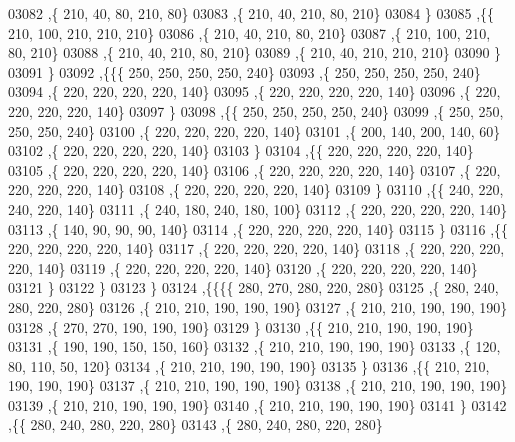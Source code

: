 \begin{DoxyCode}
03082     ,\{   210,    40,    80,   210,    80\}
03083     ,\{   210,    40,   210,    80,   210\}
03084     \}
03085    ,\{\{   210,   100,   210,   210,   210\}
03086     ,\{   210,    40,   210,    80,   210\}
03087     ,\{   210,   100,   210,    80,   210\}
03088     ,\{   210,    40,   210,    80,   210\}
03089     ,\{   210,    40,   210,   210,   210\}
03090     \}
03091    \}
03092   ,\{\{\{   250,   250,   250,   250,   240\}
03093     ,\{   250,   250,   250,   250,   240\}
03094     ,\{   220,   220,   220,   220,   140\}
03095     ,\{   220,   220,   220,   220,   140\}
03096     ,\{   220,   220,   220,   220,   140\}
03097     \}
03098    ,\{\{   250,   250,   250,   250,   240\}
03099     ,\{   250,   250,   250,   250,   240\}
03100     ,\{   220,   220,   220,   220,   140\}
03101     ,\{   200,   140,   200,   140,    60\}
03102     ,\{   220,   220,   220,   220,   140\}
03103     \}
03104    ,\{\{   220,   220,   220,   220,   140\}
03105     ,\{   220,   220,   220,   220,   140\}
03106     ,\{   220,   220,   220,   220,   140\}
03107     ,\{   220,   220,   220,   220,   140\}
03108     ,\{   220,   220,   220,   220,   140\}
03109     \}
03110    ,\{\{   240,   220,   240,   220,   140\}
03111     ,\{   240,   180,   240,   180,   100\}
03112     ,\{   220,   220,   220,   220,   140\}
03113     ,\{   140,    90,    90,    90,   140\}
03114     ,\{   220,   220,   220,   220,   140\}
03115     \}
03116    ,\{\{   220,   220,   220,   220,   140\}
03117     ,\{   220,   220,   220,   220,   140\}
03118     ,\{   220,   220,   220,   220,   140\}
03119     ,\{   220,   220,   220,   220,   140\}
03120     ,\{   220,   220,   220,   220,   140\}
03121     \}
03122    \}
03123   \}
03124  ,\{\{\{\{   280,   270,   280,   220,   280\}
03125     ,\{   280,   240,   280,   220,   280\}
03126     ,\{   210,   210,   190,   190,   190\}
03127     ,\{   210,   210,   190,   190,   190\}
03128     ,\{   270,   270,   190,   190,   190\}
03129     \}
03130    ,\{\{   210,   210,   190,   190,   190\}
03131     ,\{   190,   190,   150,   150,   160\}
03132     ,\{   210,   210,   190,   190,   190\}
03133     ,\{   120,    80,   110,    50,   120\}
03134     ,\{   210,   210,   190,   190,   190\}
03135     \}
03136    ,\{\{   210,   210,   190,   190,   190\}
03137     ,\{   210,   210,   190,   190,   190\}
03138     ,\{   210,   210,   190,   190,   190\}
03139     ,\{   210,   210,   190,   190,   190\}
03140     ,\{   210,   210,   190,   190,   190\}
03141     \}
03142    ,\{\{   280,   240,   280,   220,   280\}
03143     ,\{   280,   240,   280,   220,   280\}

\end{DoxyCode}
